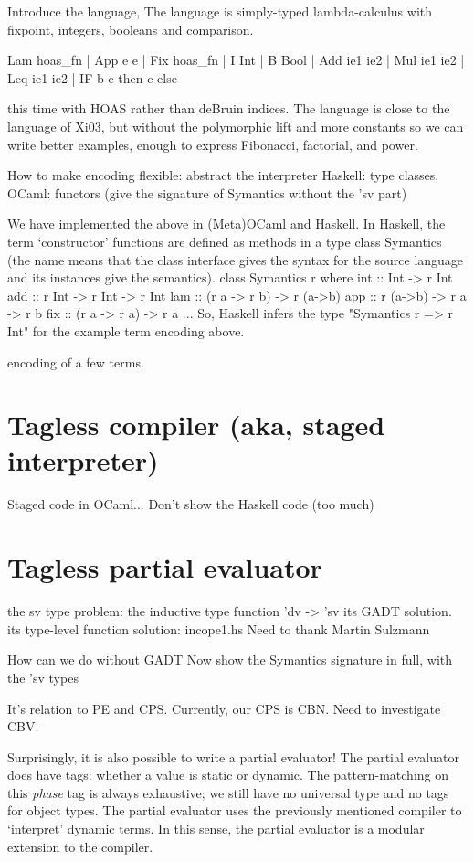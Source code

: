 \documentclass[preprint]{sigplanconf}
\begin{document}
Introduce the language, 
  The language is simply-typed lambda-calculus with fixpoint,
  integers, booleans and comparison.

\begin{code}
  Lam hoas_fn | App e e | Fix hoas_fn |
  I Int | B Bool | Add ie1 ie2 | Mul ie1 ie2 | Leq ie1 ie2 |
  IF b e-then e-else
\end{code}

this time with HOAS rather than deBruin indices. The language is close 
to the language of Xi03, but without the polymorphic lift and more 
constants so we can write better examples, enough to express
Fibonacci, factorial, and power.

How to make encoding flexible: abstract the interpreter
Haskell: type classes, OCaml: functors (give the signature of
Symantics without the 'sv part)

We have implemented the above in (Meta)OCaml and Haskell.  In Haskell,
the term `constructor' functions are defined as methods in a type class
Symantics (the name means that the class interface gives the syntax for
the source language and its instances give the semantics).
	class Symantics r where
	  int :: Int -> r Int
	  add :: r Int -> r Int -> r Int
	  lam :: (r a -> r b) -> r (a->b)
	  app :: r (a->b) -> r a -> r b
	  fix :: (r a -> r a) -> r a
	  ...
So, Haskell infers the type "Symantics r => r Int" for the example term
encoding above.


encoding of a few terms.


\section{Tagless compiler (aka, staged interpreter)}
Staged code in OCaml... Don't show the Haskell code (too much)


\section{Tagless partial evaluator}

the sv type problem: the inductive type function 'dv -> 'sv
its GADT solution. 
its type-level function solution: incope1.hs 
  Need to thank Martin Sulzmann

How can we do without GADT
Now show the Symantics signature in full, with the 'sv types

It's relation to PE and CPS. Currently, our CPS is CBN. Need to
investigate CBV.


Surprisingly, it is also possible to write a partial evaluator!  The
partial evaluator does have tags: whether a value is static or dynamic.
The pattern-matching on this \emph{phase} tag is always exhaustive; we still
have no universal type and no tags for object types.  The partial
evaluator uses the previously mentioned compiler to `interpret' dynamic
terms.  In this sense, the partial evaluator is a modular extension to
the compiler.
\end{document}
